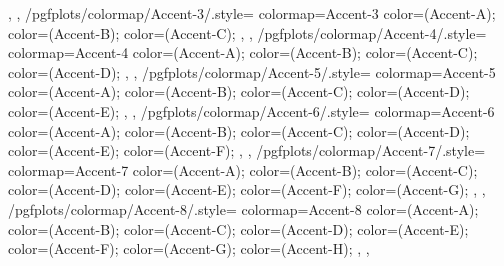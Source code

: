 {{{    },
  },
  /pgfplots/colormap/Accent-3/.style={
    colormap={Accent-3}{
      color=(Accent-A);
      color=(Accent-B);
      color=(Accent-C);
    },
  },
  /pgfplots/colormap/Accent-4/.style={
    colormap={Accent-4}{
      color=(Accent-A);
      color=(Accent-B);
      color=(Accent-C);
      color=(Accent-D);
    },
  },
  /pgfplots/colormap/Accent-5/.style={
    colormap={Accent-5}{
      color=(Accent-A);
      color=(Accent-B);
      color=(Accent-C);
      color=(Accent-D);
      color=(Accent-E);
    },
  },
  /pgfplots/colormap/Accent-6/.style={
    colormap={Accent-6}{
      color=(Accent-A);
      color=(Accent-B);
      color=(Accent-C);
      color=(Accent-D);
      color=(Accent-E);
      color=(Accent-F);
    },
  },
  /pgfplots/colormap/Accent-7/.style={
    colormap={Accent-7}{
      color=(Accent-A);
      color=(Accent-B);
      color=(Accent-C);
      color=(Accent-D);
      color=(Accent-E);
      color=(Accent-F);
      color=(Accent-G);
    },
  },
  /pgfplots/colormap/Accent-8/.style={
    colormap={Accent-8}{
      color=(Accent-A);
      color=(Accent-B);
      color=(Accent-C);
      color=(Accent-D);
      color=(Accent-E);
      color=(Accent-F);
      color=(Accent-G);
      color=(Accent-H);
    },
  },
}

